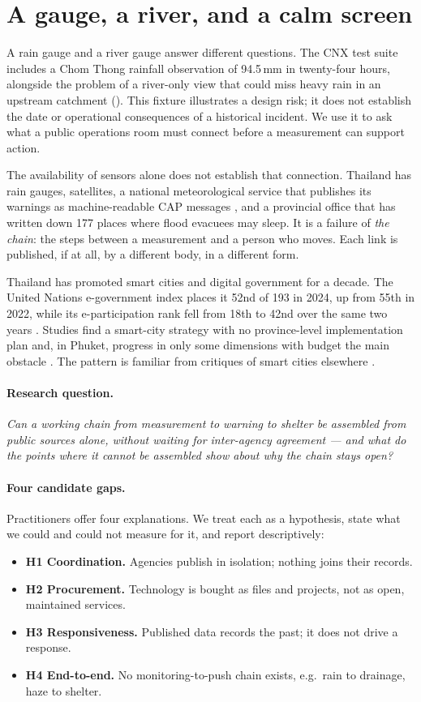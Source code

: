 \documentclass[10pt,twocolumn,a4paper]{article}
\newcommand{\hyp}[1]{\textbf{\color{sigred}#1}}
\begin{document}
\section{A gauge, a river, and a calm screen}
A rain gauge and a river gauge answer different questions. The CNX test suite includes a Chom Thong rainfall observation of 94.5\,mm in twenty-four hours, alongside the problem of a river-only view that could miss heavy rain in an upstream catchment (). This fixture illustrates a design risk; it does not establish the date or operational consequences of a historical incident. We use it to ask what a public operations room must connect before a measurement can support action.

The availability of sensors alone does not establish that connection. Thailand has rain gauges, satellites, a national meteorological service that publishes its warnings as machine-readable CAP messages \citep{tmd2026cap}, and a provincial office that has written down 177 places where flood evacuees may sleep. It is a failure of \emph{the chain}: the steps between a measurement and a person who moves. Each link is published, if at all, by a different body, in a different form.

Thailand has promoted smart cities and digital government for a decade. The United Nations e-government index places it 52nd of 193 in 2024, up from 55th in 2022, while its e-participation rank fell from 18th to 42nd over the same two years \citep{undesa2024egov}. Studies find a smart-city strategy with no province-level implementation plan \citep{naprathansuk2017} and, in Phuket, progress in only some dimensions with budget the main obstacle \citep{jamnong2022phuket}. The pattern is familiar from critiques of smart cities elsewhere \citep{hollands2008,soderstrom2014,shelton2015}.

\paragraph{Research question.} \emph{Can a working chain from measurement to warning to shelter be assembled from public sources alone, without waiting for inter-agency agreement --- and what do the points where it cannot be assembled show about why the chain stays open?}

\paragraph{Four candidate gaps.} Practitioners offer four explanations. We treat each as a hypothesis, state what we could and could not measure for it, and report descriptively:
\begin{itemize}
\item \hyp{H1 Coordination.} Agencies publish in isolation; nothing joins their records.
\item \hyp{H2 Procurement.} Technology is bought as files and projects, not as open, maintained services.
\item \hyp{H3 Responsiveness.} Published data records the past; it does not drive a response.
\item \hyp{H4 End-to-end.} No monitoring-to-push chain exists, e.g.\ rain to drainage, haze to shelter.
\end{itemize}
\end{document}
